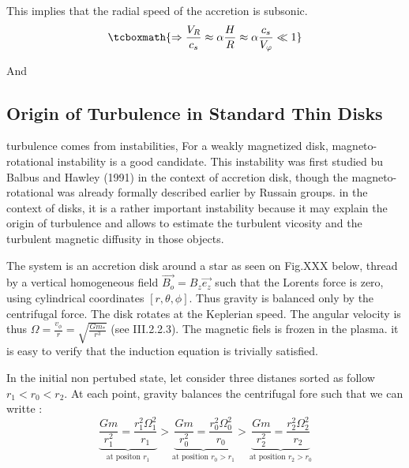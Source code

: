 \documentclass[10pt,a4paper,english,draft]{article}
\begin{document}
This implies that the radial speed of the accretion is subsonic.
\begin{equation}
    \tcboxmath{
        \Rightarrow \frac{V_R}{c_s} \approx \alpha \frac{H}{R} \approx \alpha \frac{c_s}{V_\varphi} \ll 1
    }
\end{equation}

And %

\subsection{Origin of Turbulence in Standard Thin Disks}

turbulence comes from instabilities, For a weakly magnetized disk, magneto-rotational instability is a good candidate.
This instability was first studied bu Balbus and Hawley  (1991) in the context of accretion disk, though the
magneto-rotational was already formally described earlier by Russain groups. in the context of disks, 
it is a rather important instability because it may explain the origin of turbulence and allows to estimate 
the turbulent vicosity  and the turbulent magnetic diffusity in those objects. 


The system is an accretion disk around a star as seen on Fig.XXX below, thread by a vertical homogeneous field
$\vec{B_o} = B_z\vec{e_z}$ such that the Lorents force is zero, using cylindrical coordinates $[r,\theta,\phi]$.
Thus gravity is balanced only by the centrifugal force. The disk rotates  at the Keplerian speed. The angular 
velocity is thus $\Omega = \frac{v_{\phi}}{r} = \sqrt{\frac{Gm_*}{r^3}}$  (see III.2.2.3). The magnetic fiels 
is frozen  in the plasma. it is easy to verify that the induction equation is trivially satisfied.


In the initial non pertubed state, let consider three distanes sorted as follow $r_1 < r_0 < r_2 $. At 
each point, gravity balances the centrifugal fore  such that we can writte : 
\begin{equation}
\underbrace{\frac{Gm}{r_1^2} = \frac{r_1^2\Omega_1^2}{r_1}}_{\text{at positon  } r_1} > 
\underbrace{\frac{Gm}{r_0^2} = \frac{r_0^2\Omega_0^2}{r_0}}_{\text{at position }r_0 > r_1}	>
\underbrace{\frac{Gm}{r_2^2} = \frac{r_2^2\Omega_2^2}{r_2}}_{\text{at position }r_2 > r_0}	
\end{equation}
\end{document}
